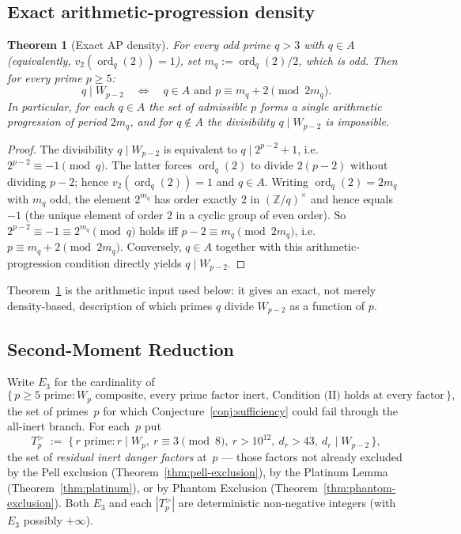\documentclass[12pt]{article}
\theoremstyle{plain}
\newtheorem{theorem}{Theorem}[section]
\theoremstyle{definition}
\theoremstyle{remark}
\begin{document}
\subsection{Exact arithmetic-progression density}

\begin{theorem}[Exact AP density]\label{thm:exact-ap}
For every odd prime \(q > 3\) with \(q \in A\) (equivalently,
\(v_2(\operatorname{ord}_q(2)) = 1\)), set
\(m_q := \operatorname{ord}_q(2)/2\), which is odd. Then for every
prime \(p \geq 5\):
\[
  q \mid W_{p-2} \quad\Longleftrightarrow\quad
  q \in A \text{ and } p \equiv m_q + 2 \pmod{2 m_q}.
\]
In particular, for each \(q \in A\) the set of admissible \(p\)
forms a single arithmetic progression of period \(2 m_q\), and
for \(q \notin A\) the divisibility \(q \mid W_{p-2}\) is
impossible.
\end{theorem}

\begin{proof}
The divisibility \(q \mid W_{p-2}\) is equivalent to
\(q \mid 2^{p-2} + 1\), i.e.\ \(2^{p-2} \equiv -1 \pmod q\). The
latter forces \(\operatorname{ord}_q(2)\) to divide \(2(p-2)\)
without dividing \(p-2\); hence
\(v_2(\operatorname{ord}_q(2)) = 1\) and \(q \in A\). Writing
\(\operatorname{ord}_q(2) = 2 m_q\) with \(m_q\) odd, the element
\(2^{m_q}\) has order exactly \(2\) in
\((\mathbb{Z}/q)^{\times}\) and hence equals \(-1\) (the unique
element of order \(2\) in a cyclic group of even order). So
\(2^{p-2} \equiv -1 \equiv 2^{m_q} \pmod q\) holds iff
\(p - 2 \equiv m_q \pmod{2 m_q}\), i.e.\ \(p \equiv m_q + 2
\pmod{2 m_q}\). Conversely, \(q \in A\) together with this
arithmetic-progression condition directly yields \(q \mid W_{p-2}\).
\end{proof}

Theorem~\ref{thm:exact-ap} is the arithmetic input used below: it
gives an exact, not merely density-based, description of which
primes \(q\) divide \(W_{p-2}\) as a function of \(p\).

\subsection{Second-Moment Reduction}

Write \(E_3\) for the cardinality of
\[
  \bigl\{\,p \geq 5 \text{ prime} : W_p \text{ composite, every prime factor inert,
  Condition~(II) holds at every factor}\,\bigr\},
\]
the set of primes~\(p\) for which Conjecture~\ref{conj:sufficiency}
could fail through the all-inert branch. For each~\(p\) put
\[
  T_p^{>} \;:=\; \{\,r \text{ prime} : r \mid W_p,\
  r \equiv 3 \pmod 8,\ r > 10^{12},\ d_r > 43,\
  d_r \mid W_{p-2}\,\},
\]
the set of \emph{residual inert danger factors} at~\(p\) --- those
factors not already excluded by the Pell exclusion
(Theorem~\ref{thm:pell-exclusion}), by the Platinum Lemma
(Theorem~\ref{thm:platinum}), or by Phantom Exclusion
(Theorem~\ref{thm:phantom-exclusion}). Both \(E_3\) and each
\(|T_p^{>}|\) are deterministic non-negative integers
(with \(E_3\) possibly \(+\infty\)).
\end{document}
